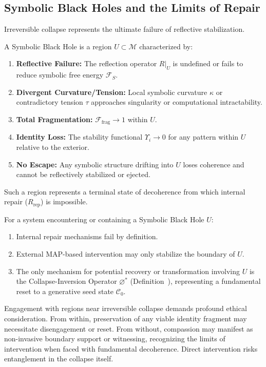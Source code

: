 \subsection{Symbolic Black Holes and the Limits of Repair}
\label{subsec:bk9_limits_of_repair}
Irreversible collapse represents the ultimate failure of reflective stabilization.
\begin{definition}
\label{definition:bk9_symbolic_black_hole}
A Symbolic Black Hole is a region $U \subset \mathcal{M}$ characterized by:
\begin{enumerate}
    \item \textbf{Reflective Failure:} The reflection operator $R|_U$ is undefined or fails to reduce symbolic free energy $\mathcal{F}_S$.
    \item \textbf{Divergent Curvature/Tension:} Local symbolic curvature $\kappa$ or contradictory tension $\tau$ approaches singularity or computational intractability.
    \item \textbf{Total Fragmentation:} $\mathcal{F}_{\text{frag}} \to 1$ within $U$.
    \item \textbf{Identity Loss:} The stability functional $\Upsilon_i \to 0$ for any pattern within $U$ relative to the exterior.
    \item \textbf{No Escape:} Any symbolic structure drifting into $U$ loses coherence and cannot be reflectively stabilized or ejected.
\end{enumerate}
Such a region represents a terminal state of decoherence from which internal repair ($R_{\text{rep}}$) is impossible.
\end{definition}
\begin{proposition}
\label{prop:bk9__escape_from_irreversible_collapse}
For a system encountering or containing a Symbolic Black Hole $U$:
\begin{enumerate}
    \item Internal repair mechanisms fail by definition.
    \item External MAP-based intervention may only stabilize the boundary of $U$.
    \item The only mechanism for potential recovery or transformation involving $U$ is the Collapse-Inversion Operator $\varnothing^*$ (Definition~), representing a fundamental reset to a generative seed state $\mathcal{C}_0$.
\end{enumerate}
\end{proposition}
\begin{scholium}
\label{sch:bk9__ethics_near_the_singularity}
Engagement with regions near irreversible collapse demands profound ethical consideration. From within, preservation of any viable identity fragment may necessitate disengagement or reset. From without, compassion may manifest as non-invasive boundary support or witnessing, recognizing the limits of intervention when faced with fundamental decoherence. Direct intervention risks entanglement in the collapse itself.
\end{scholium}
